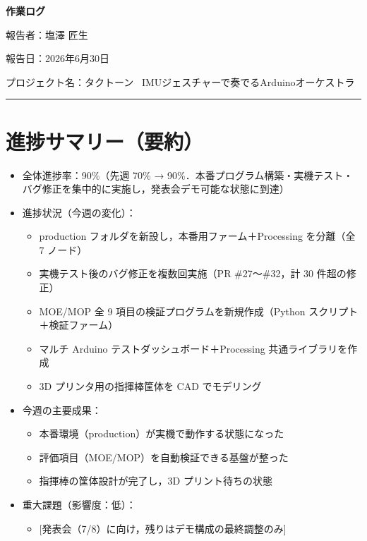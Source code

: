 \documentclass[uplatex,dvipdfmx,a4paper,11pt]{jsarticle}
\newcommand{\sectionrule}{\par\medskip\noindent\rule{\linewidth}{0.6pt}\par\medskip}
\begin{document}
{\LARGE\bfseries 作業ログ}\par\bigskip

報告者：塩澤 匠生

報告日：2026年6月30日

プロジェクト名：タクトーン~ IMUジェスチャーで奏でるArduinoオーケストラ~ \\

\sectionrule

\section{進捗サマリー（要約）}

\begin{itemize}
  \item 全体進捗率：90\%（先週 70\% → 90\%．本番プログラム構築・実機テスト・
        バグ修正を集中的に実施し，発表会デモ可能な状態に到達）
  \item 進捗状況（今週の変化）：
    \begin{itemize}
      \item production フォルダを新設し，本番用ファーム＋Processing を分離（全 7 ノード）
      \item 実機テスト後のバグ修正を複数回実施（PR \#27〜\#32，計 30 件超の修正）
      \item MOE/MOP 全 9 項目の検証プログラムを新規作成（Python スクリプト＋検証ファーム）
      \item マルチ Arduino テストダッシュボード＋Processing 共通ライブラリを作成
      \item 3D プリンタ用の指揮棒筐体を CAD でモデリング
    \end{itemize}
  \item 今週の主要成果：
    \begin{itemize}
      \item 本番環境（production）が実機で動作する状態になった
      \item 評価項目（MOE/MOP）を自動検証できる基盤が整った
      \item 指揮棒の筐体設計が完了し，3D プリント待ちの状態
    \end{itemize}
  \item 重大課題（影響度：低）：
    \begin{itemize}
      \item {}[発表会（7/8）に向け，残りはデモ構成の最終調整のみ]
    \end{itemize}
\end{itemize}
\end{document}
